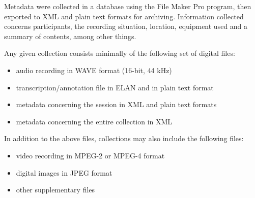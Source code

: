 Metadata were collected in a database using the File Maker Pro program, then exported to XML and plain text formats for archiving. Information collected concerns participants, the recording situation, location, equipment used and a summary of contents, among other things.

Any given collection consists minimally of the following set of digital files: %
\begin{itemize}
\item{audio recording in WAVE format (16-bit, 44 kHz)}
\item{transcription/annotation file in ELAN and in plain text format}
\item{metadata concerning the session in XML and plain text formats}
\item{metadata concerning the entire collection in XML}
\end{itemize}
In addition to the above files, collections may also include the following files:
\begin{itemize}
\item{video recording in MPEG-2 or MPEG-4 format}
\item{digital images in JPEG format}
\item{other supplementary files}
\end{itemize}

